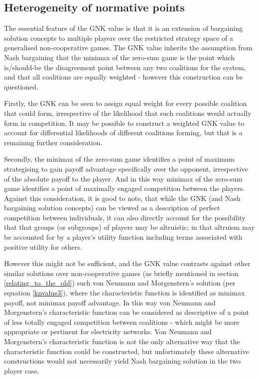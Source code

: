 \subsection{Heterogeneity of normative points}

The essential feature of the GNK value is that it is an extension of bargaining solution concepts to multiple players over the restricted strategy space of a generalised non-cooperative games.
The GNK value inherits the assumption from Nash bargaining that the minimax of the zero-sum game is the point which is/should-be the disagreement point between any two coalitions for the system, and that all coalitions are equally weighted - however this construction can be questioned.

Firstly, the GNK can be seen to assign equal weight for every possible coalition that could form, irrespective of the likelihood that such coalitions would actually form in competition.
It may be possible to construct a weighted GNK value to account for differential likelihoods of different coalitions forming, but that is a remaining further consideration.

Secondly, the minimax of the zero-sum game identifies a point of maximum strategising to gain payoff advantage specifically over the opponent, irrespective of the absolute payoff to the player.
And in this way minimax of the zero-sum game identifies a point of maximally engaged competition between the players.
Against this consideration, it is good to note, that while the GNK (and Nash bargaining solution concepts) can be viewed as a description of perfect competition between individuals, it can also directly account for the possibility that that groups (or subgroups) of players may be altruistic; in that altruism may be accounted for by a player's utility function including terms associated with positive utility for others.

However this might not be sufficient, and the GNK value contrasts against other similar solutions over non-cooperative games (as briefly mentioned in section \ref{relating_to_the_old}) such von Neumann and Morgenstern's solution (per equation \ref{knvalue3}), where the characteristic function is identified as minimax payoff, not minimax payoff advantage.
In this way von Neumann and Morgenstern's characteristic function can be considered as descriptive of a point of less totally engaged competition between coalitions - which might be more appropriate or pertinent for electricity networks.
Von Neumann and Morgenstern's characteristic function is not the only alternative way that the characteristic function could be constructed, but unfortunately these alternative constructions would not necessarily yield Nash bargaining solution in the two player case.



